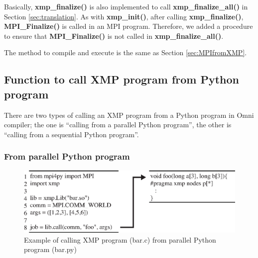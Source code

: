 \documentclass[graybox]{svmult}
\begin{document}
Basically, {\bf xmp\_finalize()} is also implemented to call  {\bf xmp\_finalize\_all()}  in Section \ref{sec:translation}.
As with  {\bf xmp\_init()},
after calling  {\bf xmp\_finalize()}, {\bf MPI\_Finalize()}  is called in an MPI program.
Therefore,
we added a procedure to ensure that  {\bf MPI\_Finalize()} is not called in  {\bf xmp\_finalize\_all()}.

The method to compile and execute is the same as Section \ref{sec:MPIfromXMP}.

\subsection{Function to call XMP program from Python program}

There are two types of calling an XMP program from a Python program in Omni compiler;
 the one is ``calling from a parallel Python program'', the other is ``calling from a sequential Python program''.

\subsubsection{From parallel Python program}
\begin{figure}[h]
\sidecaption
\includegraphics[scale=.82]{img/program3.eps}
\caption{Example of calling XMP program (bar.c) from parallel Python program (bar.py)\cite{pgas-ei}} \label{fig:program3}
\end{figure}
\end{document}
